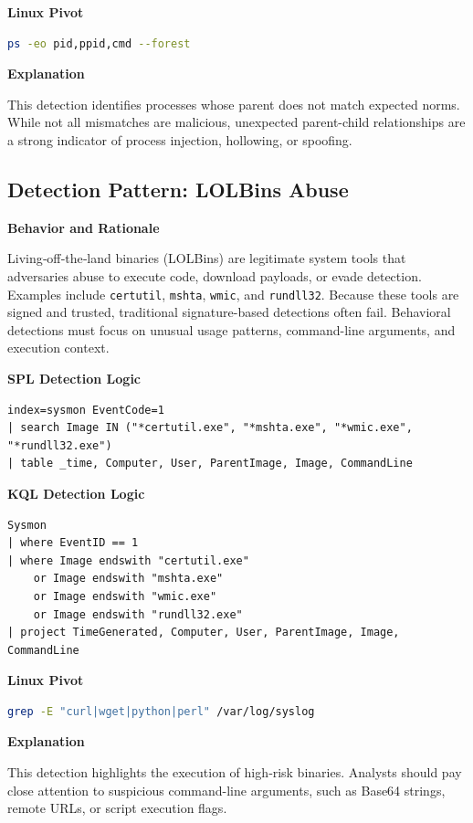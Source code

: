 \textbf{Linux Pivot}
\begin{lstlisting}[language=bash]
ps -eo pid,ppid,cmd --forest
\end{lstlisting}

\textbf{Explanation}

This detection identifies processes whose parent does not match expected norms. While not all mismatches are malicious, unexpected parent-child relationships are a strong indicator of process injection, hollowing, or spoofing.

\subsection*{Detection Pattern: LOLBins Abuse}

\textbf{Behavior and Rationale}

Living‑off‑the‑land binaries (LOLBins) are legitimate system tools that adversaries abuse to execute code, download payloads, or evade detection. Examples include \texttt{certutil}, \texttt{mshta}, \texttt{wmic}, and \texttt{rundll32}. Because these tools are signed and trusted, traditional signature-based detections often fail. Behavioral detections must focus on unusual usage patterns, command-line arguments, and execution context.

\textbf{SPL Detection Logic}
\begin{lstlisting}
index=sysmon EventCode=1
| search Image IN ("*certutil.exe", "*mshta.exe", "*wmic.exe", "*rundll32.exe")
| table _time, Computer, User, ParentImage, Image, CommandLine
\end{lstlisting}

\textbf{KQL Detection Logic}
\begin{lstlisting}
Sysmon
| where EventID == 1
| where Image endswith "certutil.exe"
    or Image endswith "mshta.exe"
    or Image endswith "wmic.exe"
    or Image endswith "rundll32.exe"
| project TimeGenerated, Computer, User, ParentImage, Image, CommandLine
\end{lstlisting}

\textbf{Linux Pivot}
\begin{lstlisting}[language=bash]
grep -E "curl|wget|python|perl" /var/log/syslog
\end{lstlisting}

\textbf{Explanation}

This detection highlights the execution of high‑risk binaries. Analysts should pay close attention to suspicious command-line arguments, such as Base64 strings, remote URLs, or script execution flags.

